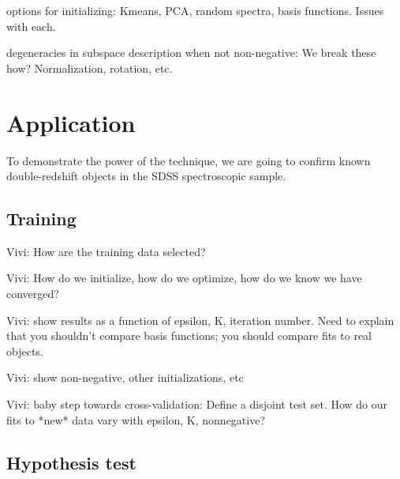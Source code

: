 \documentclass[12pt]{article}
\begin{document}
options for initializing: Kmeans, PCA, random spectra, basis functions.  Issues with each.

degeneracies in subspace description when not non-negative:  We break these how?  Normalization, rotation, etc.

\section{Application}

To demonstrate the power of the technique, we are going to confirm known double-redshift objects in the SDSS spectroscopic sample.

\subsection{Training}

Vivi: How are the training data selected?

Vivi: How do we initialize, how do we optimize, how do we know we have converged?

Vivi: show results as a function of epsilon, K, iteration number.  Need to explain that you shouldn't compare basis functions; you should compare fits to real objects.

Vivi: show non-negative, other initializations, etc

Vivi: baby step towards cross-validation:  Define a disjoint test set.  How do our fits to *new* data vary with epsilon, K, nonnegative?

\subsection{Hypothesis test}
\end{document}
